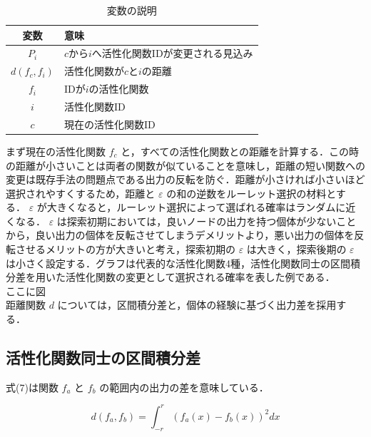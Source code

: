 \begin{table}[h]
    \caption{変数の説明}
    \centering
    \begin{tabular}{cl}
        \hline
        変数  & 意味 \\
        \hline \hline
        $P_{i}$               & $c$から$i$へ活性化関数IDが変更される見込み \\
        $d(f_{c}, f_{i})$     & 活性化関数が$c$と$i$の距離                 \\
        $f_{i}$               & IDが$i$の活性化関数                        \\
        $i$                   & 活性化関数ID                               \\
        $c$                   & 現在の活性化関数ID                         \\
        \hline
    \end{tabular}
\end{table}

まず現在の活性化関数 $ f_c $ と，すべての活性化関数との距離を計算する．この時の距離が小さいことは両者の関数が似ていることを意味し，距離の短い関数への変更は既存手法の問題点である出力の反転を防ぐ．距離が小さければ小さいほど選択されやすくするため，距離と $ \varepsilon $ の和の逆数をルーレット選択の材料とする． $ \varepsilon $ が大きくなると，ルーレット選択によって選ばれる確率はランダムに近くなる． $ \varepsilon $ は探索初期においては，良いノードの出力を持つ個体が少ないことから，良い出力の個体を反転させてしまうデメリットより，悪い出力の個体を反転させるメリットの方が大きいと考え，探索初期の $ \varepsilon $ は大きく，探索後期の $ \varepsilon $ は小さく設定する．グラフは代表的な活性化関数4種，活性化関数同士の区間積分差を用いた活性化関数の変更として選択される確率を表した例である．\\

ここに図 \\

距離関数 $ d $ については，区間積分差と，個体の経験に基づく出力差を採用する．

\clearpage
\subsection{活性化関数同士の区間積分差}
式(7)は関数 $ f_a $ と $ f_b $ の範囲内の出力の差を意味している．

\begin{equation}
    d(f_{a}, f_{b}) = \int^{r}_{-r} (f_{a}(x) - f_{b}(x))^{2} dx
\end{equation}

